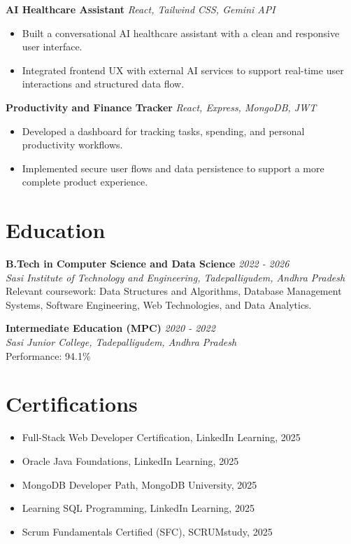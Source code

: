 \documentclass[10pt,a4paper]{article}
\begin{document}
\textbf{AI Healthcare Assistant} \hfill \textit{React, Tailwind CSS, Gemini API}\\
\begin{itemize}
  \item Built a conversational AI healthcare assistant with a clean and responsive user interface.
  \item Integrated frontend UX with external AI services to support real-time user interactions and structured data flow.
\end{itemize}

\textbf{Productivity and Finance Tracker} \hfill \textit{React, Express, MongoDB, JWT}\\
\begin{itemize}
  \item Developed a dashboard for tracking tasks, spending, and personal productivity workflows.
  \item Implemented secure user flows and data persistence to support a more complete product experience.
\end{itemize}

\section*{\textcolor{accent}{Education}}
\textbf{B.Tech in Computer Science and Data Science} \hfill \textit{2022 - 2026}\\
\textit{Sasi Institute of Technology and Engineering, Tadepalligudem, Andhra Pradesh}\\
Relevant coursework: Data Structures and Algorithms, Database Management Systems, Software Engineering, Web Technologies, and Data Analytics.

\vspace{0.15cm}
\textbf{Intermediate Education (MPC)} \hfill \textit{2020 - 2022}\\
\textit{Sasi Junior College, Tadepalligudem, Andhra Pradesh}\\
Performance: 94.1\%

\section*{\textcolor{accent}{Certifications}}
\begin{itemize}
  \item Full-Stack Web Developer Certification, LinkedIn Learning, 2025
  \item Oracle Java Foundations, LinkedIn Learning, 2025
  \item MongoDB Developer Path, MongoDB University, 2025
  \item Learning SQL Programming, LinkedIn Learning, 2025
  \item Scrum Fundamentals Certified (SFC), SCRUMstudy, 2025
\end{itemize}
\end{document}

